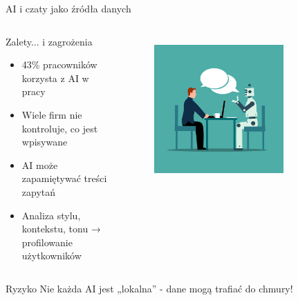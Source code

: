 \begin{frame}{AI i czaty jako źródła danych}
\begin{columns}[c]
    \begin{block}{Zalety... i zagrożenia}
        \begin{itemize}
          \item 43\% pracowników korzysta z AI w pracy
          \item Wiele firm nie kontroluje, co jest wpisywane
          \item AI może zapamiętywać treści zapytań
          \item Analiza stylu, kontekstu, tonu → profilowanie użytkowników \cite{ai}
        \end{itemize}
        \end{block}
    \centering
    \begin{figure}
        \centering
        \includegraphics[width=0.75\textwidth]{images/interview.png}
        \label{fig:interview}
    \end{figure}    
\end{columns}
\pause        
\begin{alertblock}{Ryzyko}
    Nie każda AI jest „lokalna” - dane mogą trafiać do chmury!
    \end{alertblock}
\end{frame}
